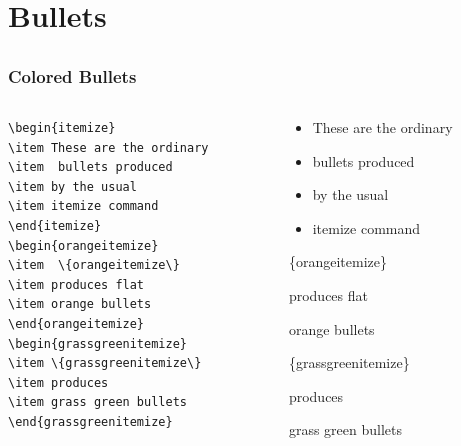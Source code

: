 \documentclass[[newPxFont]{beamer}
\begin{document}
\section{Bullets}
\subsection{}
\begin{frame}[fragile]
\frametitle{Colored Bullets}
\vspace{-.45cm}
\begin{small}
\begin{columns}
  \begin{column}{.55\textwidth}
\begin{block}{}
\begin{verbatim}
\begin{itemize}
\item These are the ordinary
\item  bullets produced
\item by the usual 
\item itemize command
\end{itemize} 
\begin{orangeitemize}
\item  \{orangeitemize\}
\item produces flat 
\item orange bullets
\end{orangeitemize}
\begin{grassgreenitemize}
\item \{grassgreenitemize\}
\item produces
\item grass green bullets
\end{grassgreenitemize}
\end{verbatim}
\end{block}
\end{column}
\begin{column}{.45\textwidth}
\begin{block}{}
\begin{itemize}
\item These are the ordinary
\item  bullets produced
\item by the usual 
\item itemize command
\end{itemize} 
\begin{orangeitemize}
\item  \{orangeitemize\}
\item produces flat 
\item orange bullets
\end{orangeitemize}
\begin{grassgreenitemize}
\item \{grassgreenitemize\} 
\item produces 
\item grass green bullets
\end{grassgreenitemize}
\end{block}
\end{column}
\end{columns}
\end{small}
\end{frame}
\end{document}

